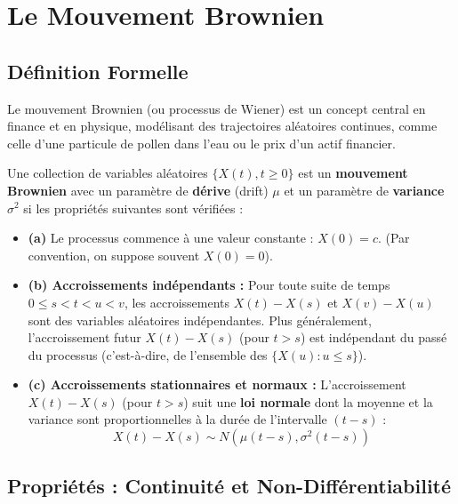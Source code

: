 \newpage

\section{Le Mouvement Brownien}

\subsection{Définition Formelle}

Le mouvement Brownien (ou processus de Wiener) est un concept central en finance et en physique, modélisant des trajectoires aléatoires continues, comme celle d'une particule de pollen dans l'eau ou le prix d'un actif financier.

\begin{theorembox}
Une collection de variables aléatoires $\{X(t), t \ge 0\}$ est un \textbf{mouvement Brownien} avec un paramètre de \textbf{dérive} (drift) $\mu$ et un paramètre de \textbf{variance} $\sigma^2$ si les propriétés suivantes sont vérifiées :

\begin{itemize}
    \item \textbf{(a)} Le processus commence à une valeur constante : $X(0) = c$. (Par convention, on suppose souvent $X(0) = 0$).
    
    \item \textbf{(b) Accroissements indépendants :} Pour toute suite de temps $0 \le s < t < u < v$, les accroissements $X(t) - X(s)$ et $X(v) - X(u)$ sont des variables aléatoires indépendantes. Plus généralement, l'accroissement futur $X(t) - X(s)$ (pour $t>s$) est indépendant du passé du processus (c'est-à-dire, de l'ensemble des $\{X(u) : u \le s\}$).
    
    \item \textbf{(c) Accroissements stationnaires et normaux :} L'accroissement $X(t) - X(s)$ (pour $t>s$) suit une \textbf{loi normale} dont la moyenne et la variance sont proportionnelles à la durée de l'intervalle $(t-s)$ :
    $$ X(t) - X(s) \sim N\left(\mu(t-s), \sigma^2(t-s)\right) $$
\end{itemize}
\end{theorembox}

\subsection{Propriétés : Continuité et Non-Différentiabilité}

